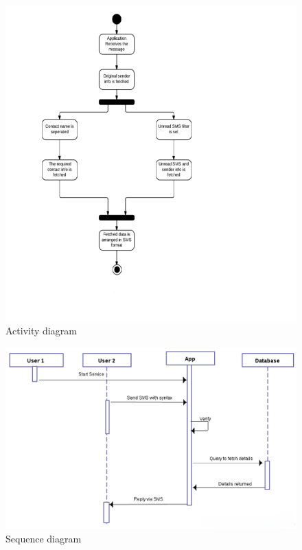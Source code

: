 	
	\begin{figure}[h!]
		\includegraphics[width=5.5in]{activity.png} %
		\caption{Activity diagram}
		\label{fig:7} %
		
	\end{figure} 

	 
	\begin{figure}[h!]
		\includegraphics[width=5.5in]{sequence.png} %
		\caption{Sequence diagram}
		\label{fig:8} %
		
	\end{figure} 
\newpage
\clearpage
